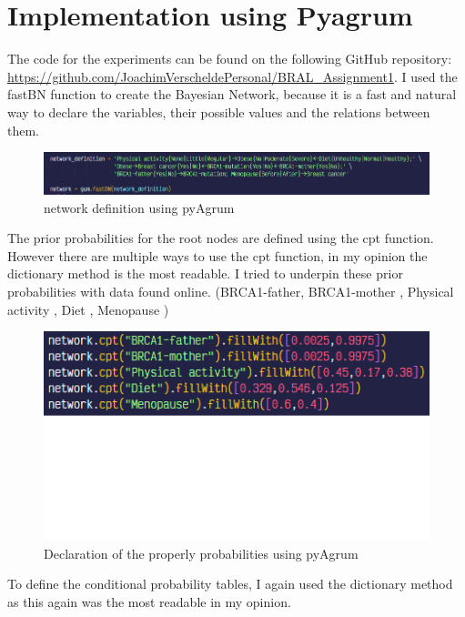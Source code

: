 \documentclass{article}
\begin{document}
\section{Implementation using Pyagrum}
The code for the experiments can be found on the following GitHub repository: \url{https://github.com/JoachimVerscheldePersonal/BRAL_Assignment1}.
I used the fastBN function to create the Bayesian Network, because it is a fast and natural way to declare the variables, their possible values and the relations between them.
\begin{figure}[H]
    \centering
    \includegraphics[width=\textwidth]{../figures/network_definition.png}
    \caption{network definition using pyAgrum}
    \label{fig:bayesian_network}
\end{figure}

The prior probabilities for the root nodes are defined using the cpt function. However there are multiple ways to use the cpt function, in my opinion the dictionary method is the most readable.
I tried to underpin these prior probabilities with data found online. (BRCA1-father, BRCA1-mother \cite{cancergov}, Physical activity \cite{eucommission}, Diet \cite{eurostat2}, Menopause \cite{ourworldindata})

\begin{figure}[H]
    \centering
    \includegraphics[width=\textwidth]{../figures/prior_declaration.png}
    \caption{Declaration of the properly probabilities using pyAgrum}
    \label{fig:prior_declaration}
\end{figure}
To define the conditional probability tables, I again used the dictionary method as this again was the most readable in my opinion.
\end{document}
